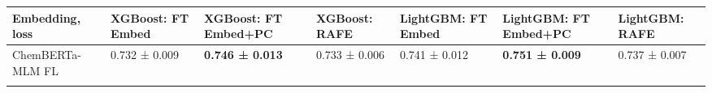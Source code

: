 \documentclass[
  10pt,
]{article}
\begin{document}
\begin{longtable}[]{@{}lllllll@{}}
\toprule
\begin{minipage}[b]{0.12\columnwidth}\raggedright
Embedding, loss\strut
\end{minipage} & \begin{minipage}[b]{0.12\columnwidth}\raggedright
XGBoost: FT Embed\strut
\end{minipage} & \begin{minipage}[b]{0.12\columnwidth}\raggedright
XGBoost: FT Embed+PC\strut
\end{minipage} & \begin{minipage}[b]{0.12\columnwidth}\raggedright
XGBoost: RAFE\strut
\end{minipage} & \begin{minipage}[b]{0.12\columnwidth}\raggedright
LightGBM: FT Embed\strut
\end{minipage} & \begin{minipage}[b]{0.12\columnwidth}\raggedright
LightGBM: FT Embed+PC\strut
\end{minipage} & \begin{minipage}[b]{0.12\columnwidth}\raggedright
LightGBM: RAFE\strut
\end{minipage}\tabularnewline
\midrule
\endhead
\begin{minipage}[t]{0.12\columnwidth}\raggedright
ChemBERTa-MLM FL\strut
\end{minipage} & \begin{minipage}[t]{0.12\columnwidth}\raggedright
0.732 ± 0.009\strut
\end{minipage} & \begin{minipage}[t]{0.12\columnwidth}\raggedright
\textbf{0.746 ± 0.013}\strut
\end{minipage} & \begin{minipage}[t]{0.12\columnwidth}\raggedright
0.733 ± 0.006\strut
\end{minipage} & \begin{minipage}[t]{0.12\columnwidth}\raggedright
0.741 ± 0.012\strut
\end{minipage} & \begin{minipage}[t]{0.12\columnwidth}\raggedright
\textbf{0.751 ± 0.009}\strut
\end{minipage} & \begin{minipage}[t]{0.12\columnwidth}\raggedright
0.737 ± 0.007\strut
\end{minipage}\tabularnewline
\begin{minipage}[t]{0.12\columnwidth}\raggedright

\end{minipage}
\end{longtable}
\end{document}
